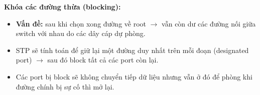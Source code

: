 \noindent
\textbf{Khóa các đường thừa (blocking):}

\begin{itemize}
    \item \textbf{Vấn đề:} sau khi chọn xong đường về root $\rightarrow$ vẫn còn dư các đường nối giữa switch với nhau do các dây cáp dự phòng.
    \item[$\rightarrow$] STP sẽ tính toán để giữ lại một đường duy nhất trên mỗi đoạn (designated port) $\rightarrow$ sau đó block tất cả các port còn lại.
    \item[$\Rightarrow$] Các port bị block sẽ không chuyển tiếp dữ liệu nhưng vẫn ở đó để phòng khi đường chính bị sự cố thì mở lại.
\end{itemize}
\medskip
